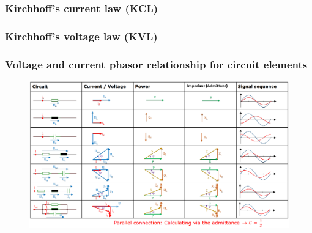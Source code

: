 \documentclass{article}
\begin{document}
\subsubsection{Kirchhoff's current law (KCL)}

\subsubsection{Kirchhoff's voltage law (KVL)}

\subsubsection{Voltage and current phasor relationship for circuit elements}

\clearpage
\begin{landscape}

  \begin{figure}[p]
    \centering
    \includegraphics[width=1.5\textheight]{media/shifts_summary.png}
  \end{figure}

\end{landscape}
\clearpage  
\end{document}
